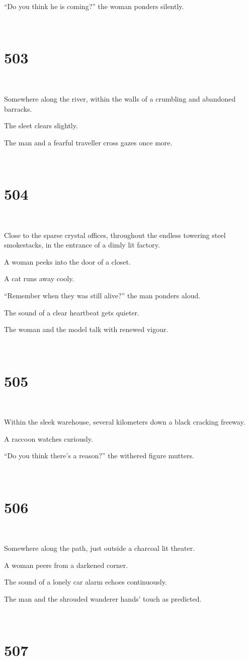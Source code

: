 \documentclass{report}
\begin{document}
``Do you think he is coming?'' the woman ponders silently.

~
\chapter*{503}
~

Somewhere along the river, within the walls of a crumbling and abandoned barracks.

The sleet clears slightly.

The man and a fearful traveller cross gazes once more.

~
\chapter*{504}
~

Close to the sparse crystal offices, throughout the endless towering steel smokestacks, in the entrance of a dimly lit factory.

A woman peeks into the door of a closet.

A cat runs away cooly.

``Remember when they was still alive?'' the man ponders aloud.

The sound of a clear heartbeat gets quieter.

The woman and the model talk with renewed vigour.

~
\chapter*{505}
~

Within the sleek warehouse, several kilometers down a black cracking freeway.

A raccoon watches curiously.

``Do you think there's a reason?'' the withered figure mutters.

~
\chapter*{506}
~

Somewhere along the path, just outside a charcoal lit theater.

A woman peers from a darkened corner.

The sound of a lonely car alarm echoes continuously.

The man and the shrouded wanderer hands' touch as predicted.

~
\chapter*{507}
~
\end{document}
